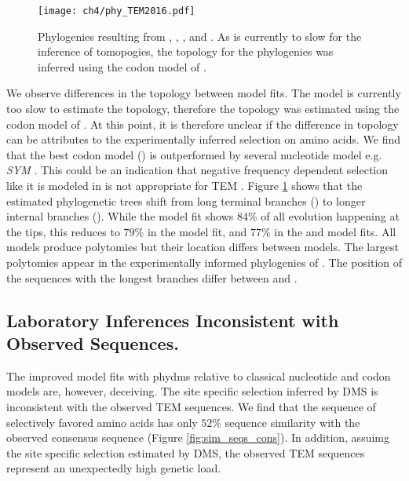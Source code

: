 \begin{figure}[H]
     \centering
	\texttt{[image: ch4/phy\_TEM2016.pdf]}
	\caption{Phylogenies resulting from \selac, \selacDMS, \phydms, and \gy. As \selac is currently to slow for the inference of tomopogies, the topology for the \selac phylogenies was inferred using the codon model of \citet{KosiolEtAl07}.}
	\label{fig:phylo}
\end{figure}

We observe differences in the topology between model fits.
The \selac model is currently too slow to estimate the topology, therefore the topology was estimated using the codon model of \citet{KosiolEtAl07}.
At this point, it is therefore unclear if the difference in topology can be attributes to the experimentally inferred selection on amino acids.
We find that the best codon model (\gy) \citep{GoldmanAndYang1994} is outperformed by several nucleotide model e.g. \emph{SYM} \citep{zharkikh1994}.
This could be an indication that negative frequency dependent selection like it is modeled in \gy is not appropriate for TEM \citep{GoldmanAndYang1994,beaulieu2018}.
Figure \ref{fig:phylo} shows that the estimated phylogenetic trees shift from long terminal branches (\selac) to longer internal branches (\phydms).
While the \selac model fit shows $84 \%$ of all evolution happening at the tips, this reduces to $79 \%$ in the \selacDMS model fit, and $77 \%$ in the \phydms and \gy model fits.
All models produce polytomies but their location differs between models.
The largest polytomies appear in the experimentally informed phylogenies of \phydms.
The position of the sequences with the longest branches differ between \selac and \phydms.


\subsection{Laboratory Inferences Inconsistent with Observed Sequences.}
The improved model fits with phydms relative to classical nucleotide and codon models are, however, deceiving.
The site specific selection inferred by DMS is inconsistent with the observed TEM sequences.
We find that the sequence of selectively favored amino acids has only $52 \%$ sequence similarity with the observed consensus sequence (Figure \ref{fig:sim_seqs_cons}).
In addition, assuimg the site specific selection estimated by DMS, the observed TEM sequences represent an unexpectedly high genetic load.

